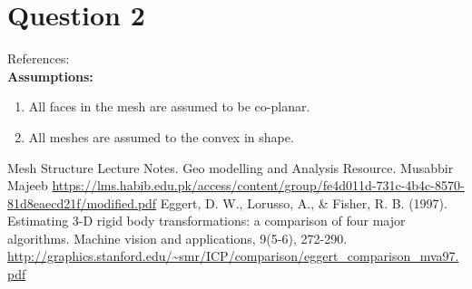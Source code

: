 \documentclass[a4paper, 11pt]{article}
\begin{document}
\newpage

\section*{Question 2}
References: \cite{Mesh notes}\\
\textbf{Assumptions:}
\begin{enumerate}[label=\alph*.]
    \item
    All faces in the mesh are assumed to be co-planar.
    \item
    All meshes are assumed to the convex in shape.
    
\end{enumerate}

\begin{thebibliography}{1}
Mesh Structure Lecture Notes. Geo modelling and Analysis Resource. Musabbir Majeeb \url{https://lms.habib.edu.pk/access/content/group/fe4d011d-731c-4b4c-8570-81d8eaecd21f/modified.pdf} 
Eggert, D. W., Lorusso, A., \& Fisher, R. B. (1997). Estimating 3-D rigid body transformations: a comparison of four major algorithms. Machine vision and applications, 9(5-6), 272-290. \url{http://graphics.stanford.edu/~smr/ICP/comparison/eggert_comparison_mva97.pdf} 

\end{thebibliography}
\end{document}
